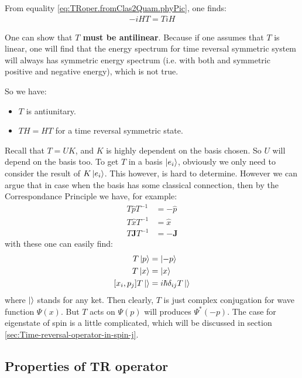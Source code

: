 \documentclass{article}
\numberwithin{equation}{subsection} %
\theoremstyle{definition}
\begin{document}
    From equality \ref{eq:TRoper.fromClas2Quam.phyPic}, one finds:
    \begin{align}
        -iHT = T i H
    \end{align}

    One can show that \textbf{$T$ must be antilinear}. Because if one
    assumes that $T$ is linear, one will find that the energy
    spectrum for time reversal symmetric system will always has symmetric
    energy spectrum (i.e. with both and symmetric positive and negative
    energy), which is not true.

    So we have:
    \begin{itemize}
        \item $T$ is antiunitary.
        \item $T H=HT$ for a time reversal symmetric state.
    \end{itemize}
    
    Recall that $T= UK$, and $K$ is highly dependent on the basis
    chosen. So $U$ will depend on the basis too. To get $T$ in a
    basis $\ket{e_i}$, obviously we only need to consider the result of
    $K\ket{e_i}$. This however, is hard to determine. However we can argue
    that in case when the basis has some classical connection, then by the
    Correspondance Principle we have, for example:
    \begin{align}
        T \hat{p} T^{-1}&= -\hat{p} \\
        T \hat{x} T^{-1}&= \hat{x} \\
        T \mathbf{J} T^{-1}&= -\mathbf{J}
    \end{align}
    with these one can easily find:
    \begin{align}
        T \ket{p} &= \ket{-p} \\
        T \ket{x} &= \ket{x} \\
        [x_i, p_j]T \ket{} &= i\hbar \delta_{ij} T\ket{}
    \end{align}
    where $\ket{}$ stands for any ket. Then clearly, $T$ is just
    complex conjugation for wave function $\Psi(x)$. But $T$ acts on
    $\Psi(p)$ will produces $\Psi^*(-p)$. The case for eigenstate of
    spin is a little complicated, which will be discussed in section
    \ref{sec:Time-reversal-operator-in-spin-j}.

    \subsection{Properties of TR operator}
    \label{sec:Properties-of-TR-operator}
    
\end{document}
